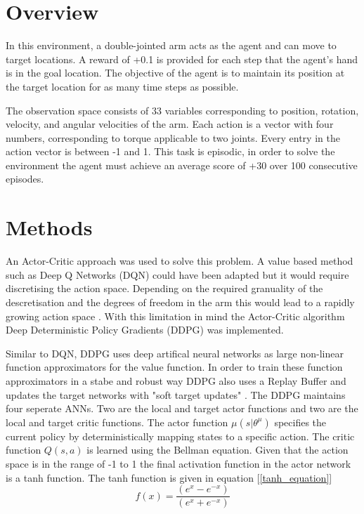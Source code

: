 \documentclass[12pt]{article}
\begin{document}
\maketitle


\section{Overview}
In this environment, a double-jointed arm acts as the agent and can move to target locations.
A reward of +0.1 is provided for each step that the agent's hand is in the goal location. 
The objective of the agent is to maintain its position at the target location for as many time steps as possible.

The observation space consists of 33 variables corresponding to position, rotation, velocity, and angular velocities of the arm. 
Each action is a vector with four numbers, corresponding to torque applicable to two joints. 
Every entry in the action vector is between -1 and 1.
This task is episodic, in order to solve the environment the agent must achieve an average score of +30 over 100 consecutive episodes.

\section{Methods}
\label{methods}
An Actor-Critic approach was used to solve this problem.
A value based method such as Deep Q Networks (DQN) \cite{dqn_paper} could have been adapted but it would require discretising the action space. 
Depending on the required granuality of the descretisation and the degrees of freedom in the arm this would lead to a rapidly growing action space \cite{curse_of_dimensionality}.
With this limitation in mind the Actor-Critic algorithm Deep Deterministic Policy Gradients (DDPG)\cite{ddpg_paper} was implemented.

Similar to DQN, DDPG uses deep artifical neural networks as large non-linear function approximators for the value function.
In order to train these function approximators in a stabe and robust way DDPG also uses a Replay Buffer\cite{experience_replay} and updates the target networks with "soft target updates" \cite{ddpg_paper}.
The DDPG maintains four seperate ANNs.
Two are the local and target actor functions and two are the local and target critic functions.
The actor function $\mu(s|\theta^{\mu})$ specifies the current policy by deterministically mapping states to a specific action.
The critic function $Q(s,a)$ is learned using the Bellman equation.
Given that the action space is in the range of -1 to 1 the final activation function in the actor network is a tanh function.
The tanh function is given in equation [\ref{tanh_equation}]
\begin{equation}
\label{tanh_equation}
f(x) = \frac{(e^x - e^{-x})}{(e^x+e^{-x})}
\end{equation}
\end{document}
